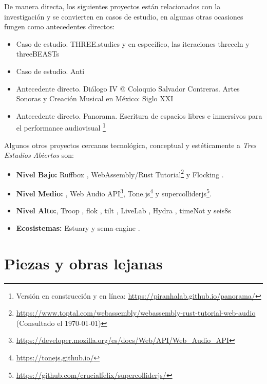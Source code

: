 De manera directa, los siguientes proyectos están relacionados con la investigación y se convierten en casos de estudio, en algunas otras ocasiones fungen como antecedentes directos:

\begin{itemize}

\item Caso de estudio. THREE.studies \citep{threestudies} y en específico, las iteraciones threecln \citep{threecln} y threeBEASTs \citep{threeBEASTs}
\item Caso de estudio. Anti \citep{anti} 
\item Antecedente directo. Diálogo IV @ Coloquio Salvador Contreras. Artes Sonoras y Creación Musical en México: Siglo XXI \citep{dialogo}
\item Antecedente directo. Panorama. Escritura de espacios libres e inmersivos para el performance audiovisual \citep{panoramaArticulo}\footnote{Versión en construcción y en línea: \url{https://piranhalab.github.io/panorama/}}
  
\end{itemize}

Algunos otros proyectos cercanos tecnológica, conceptual y estéticamente a \textit{Tres Estudios Abiertos} son: 

\begin{itemize}

\item \textbf{Nivel Bajo:} Ruffbox \citep{ruffbox}, WebAssembly/Rust Tutorial\footnote{\url{https://www.toptal.com/webassembly/webassembly-rust-tutorial-web-audio} (Consultado el \today)} y Flocking \citep{flocking}. 
\item \textbf{Nivel Medio:} \citep{supercolliderweb}, Web Audio API\footnote{\url{https://developer.mozilla.org/es/docs/Web/API/Web_Audio_API}}, Tone.js\footnote{\url{https://tonejs.github.io/}} y supercolliderjs\footnote{\url{https://github.com/crucialfelix/supercolliderjs/}}.
\item \textbf{Nivel Alto:}, Troop \citep{Troop}, flok \citep{flok}, tilt \citep{tilt}, LiveLab \citep{livelab}, Hydra \citep{hydra}, timeNot \citep{timenot} y seis8s \citep{seis8s}
\item \textbf{Ecosistemas:} Estuary \citep{estuary} y sema-engine \citep{sema}.
  
\end{itemize}

\section{Piezas y obras lejanas}

